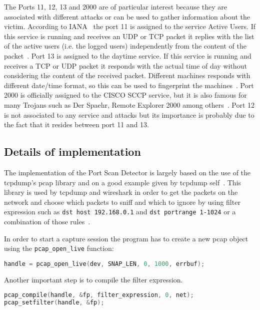 The Ports 11, 12, 13 and 2000 are of particular interest because they are associated with different attacks or can be used
to gather information about the victim.
According to IANA~\cite{IANAPORTS} the port 11 is assigned to the service Active Users. If this service is running and
receives an UDP or TCP packet it replies with the list of the active users (i.e. the logged users) independently from the content of the packet~\cite{systat}.
Port 13 is assigned to the daytime service. If this service is running and receives a TCP or UDP packet it responds with the actual time of day without considering
the content of the received packet. Different machines responds with different date/time format, so this can be used to fingerprint the machines~\cite{portDetails}.
Port 2000 is officially assigned to the CISCO SCCP service, but it is also famous for 
many Trojans such as Der Spaehr, Remote Explorer 2000 among others~\cite{portDetails}.
Port 12 is not associated to any service and attacks but its importance is probably due to the fact that it resides between port 11 and 13.




\subsection{Details of implementation}
The implementation of the Port Scan Detector is largely based on the use of the tcpdump's pcap library
and on a good example given by tcpdump self~\cite{pcaptcpdump}.
This library is used by tcpdump and wireshark in order to get  the packets on the network and choose 
which packets to sniff and which to ignore by using filter expression such as \lstinline!dst host 192.168.0.1! and \lstinline!dst portrange 1-1024!
or a combination of those rules~\cite{pcapFilterRules}.



In order to start a capture session the program has to create a new pcap object using the \lstinline!pcap_open_live! function:
\begin{lstlisting}[frame= single, language=C, caption={Create a new pcap handler.}, label=lst:open_live]
handle = pcap_open_live(dev, SNAP_LEN, 0, 1000, errbuf);
\end{lstlisting}
Another important step is to compile the filter expression. 
\begin{lstlisting}[frame= single, language=C, caption=Pcap functions called to compile the filter expression and to set it.]
pcap_compile(handle, &fp, filter_expression, 0, net);
pcap_setfilter(handle, &fp);
\end{lstlisting}

